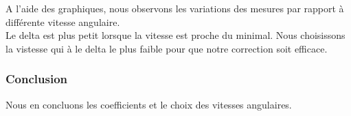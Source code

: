 \documentclass[12pt,french]{article}
\begin{document}
A l'aide des graphiques, nous observons les variations des mesures par rapport à différente vitesse angulaire. \\
Le delta est plus petit lorsque la vitesse est proche du minimal. Nous choisissons la vistesse qui à le delta le plus faible pour que notre correction soit efficace.\\

\subsubsection{Conclusion}

Nous en concluons les coefficients et le choix des vitesses angulaires.
\end{document}
